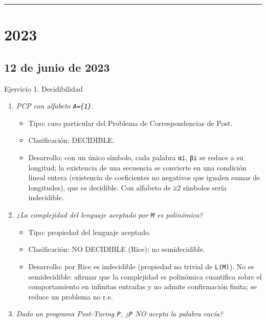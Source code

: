 \documentclass[12pt]{book} %
\providecommand{\tightlist}{%
  \setlength{\itemsep}{0pt}\setlength{\parskip}{0pt}}
\begin{document}
\begin{center}\rule{0.5\linewidth}{0.5pt}\end{center}

\hypertarget{section-2}{%
\section{2023}\label{section-2}}

\hypertarget{de-junio-de-2023}{%
\subsection{12 de junio de 2023}\label{de-junio-de-2023}}

Ejercicio 1. Decidibilidad

\begin{enumerate}
\def\labelenumi{\arabic{enumi}.}
\tightlist
\item
  \emph{PCP con alfabeto \texttt{A=\{1\}}.}

  \begin{itemize}
  \tightlist
  \item
    Tipo: caso particular del Problema de Correspondencias de Post.
  \item
    Clasificación: DECIDIBLE.
  \item
    Desarrollo: con un único símbolo, cada palabra \texttt{αi},
    \texttt{βi} se reduce a su longitud; la existencia de una secuencia
    se convierte en una condición lineal entera (existencia de
    coeficientes no negativos que igualen sumas de longitudes), que es
    decidible. Con alfabeto de ≥2 símbolos sería indecidible.
  \end{itemize}
\item
  \emph{¿La complejidad del lenguaje aceptado por \texttt{M} es
  polinómica?}

  \begin{itemize}
  \tightlist
  \item
    Tipo: propiedad del lenguaje aceptado.
  \item
    Clasificación: NO DECIDIBLE (Rice); no semidecidible.
  \item
    Desarrollo: por Rice es indecidible (propiedad no trivial de
    \texttt{L(M)}). No es semidecidible: afirmar que la complejidad es
    polinómica cuantifica sobre el comportamiento en infinitas entradas
    y no admite confirmación finita; se reduce un problema no r.e.
  \end{itemize}
\item
  \emph{Dado un programa Post-Turing \texttt{P}, ¿\texttt{P} NO acepta
  la palabra vacía?}


\end{enumerate}
\end{document}
